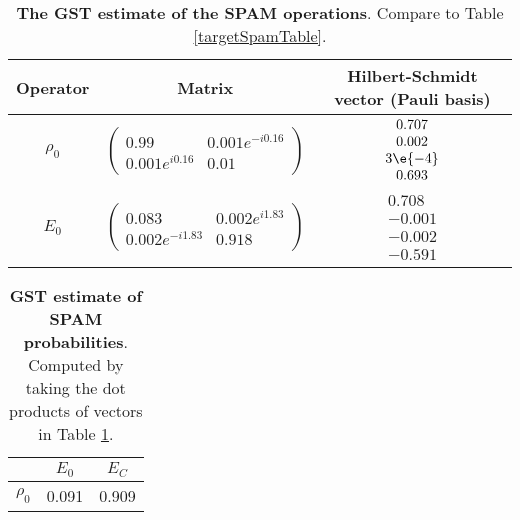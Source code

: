 {\begin{table}[h]
\begin{center}
\begin{tabular}[l]{|c|c|c|}
\hline
Operator & Matrix & Hilbert-Schmidt vector (Pauli basis) \\ \hline
$\rho_{0}$ & $ \left(\!\!\begin{array}{cc}
0.99 & 0.001e^{-i0.16} \\ 
0.001e^{i0.16} & 0.01
 \end{array}\!\!\right) $
 & $ \begin{array}{c}
0.707 \\ 
0.002 \\ 
3\e{-4} \\ 
0.693
 \end{array} $
 \\ \hline
$E_{0}$ & $ \left(\!\!\begin{array}{cc}
0.083 & 0.002e^{i1.83} \\ 
0.002e^{-i1.83} & 0.918
 \end{array}\!\!\right) $
 & $ \begin{array}{c}
0.708 \\ 
-0.001 \\ 
-0.002 \\ 
-0.591
 \end{array} $
 \\ \hline
\end{tabular}

\caption{\textbf{The GST estimate of the SPAM operations}.  Compare to Table \ref{targetSpamTable}.\label{bestCPTPGatesetSpamTable}}
\end{center}
\end{table}

\begin{table}[h]
\begin{center}
\begin{tabular}[l]{|c|c|c|}
\hline
 & $E_{0}$ & $E_C$ \\ \hline
$\rho_{0}$ & 0.091 & 0.909 \\ \hline
\end{tabular}

\caption{\textbf{GST estimate of SPAM probabilities}.  Computed by taking the dot products of vectors in Table \ref{bestCPTPGatesetSpamTable}.\label{bestCPTPGatesetSpamParametersTable}}
\end{center}
\end{table}

}
